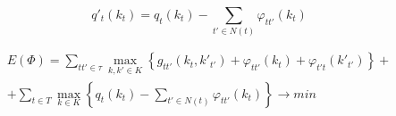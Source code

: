 \begin{equation*}
  q'_{t} \left( k_{t} \right) = q_{t}\left( k_{t} \right)
    - \sum_{t' \in N\left( t \right)} \varphi_{tt'} \left( k_{t} \right)
\end{equation*}

\begin{equation*}
  \begin{split}
    E\left( \Phi \right) =
      \sum_{tt' \in \tau} \max\limits_{k, k' \in K}{
        \left\{g_{tt'}\left( k_{t}, k'_{t'} \right) +
        \varphi_{tt'}\left( k_{t} \right) + \varphi_{t't}\left( k'_{t'} \right)
      \right\}} + \\ +
      \sum_{t \in T} \max\limits_{k \in K}{
        \left\{q_{t} \left( k_{t} \right) -
        \sum_{t' \in N\left( t \right)} \varphi_{tt'} \left( k_{t}
      \right)\right\}}
    \rightarrow min
  \end{split}
\end{equation*}

